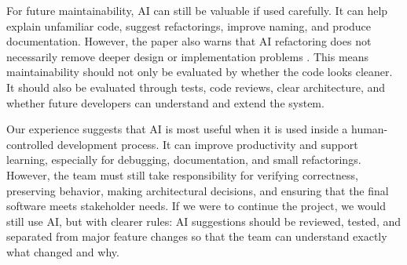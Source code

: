 For future maintainability, AI can still be valuable if used carefully.
It can help explain unfamiliar code, suggest refactorings, improve naming, and produce documentation.
However, the paper also warns that AI refactoring does not necessarily remove deeper design or implementation problems \cite{Study_of_AI}. 
This means maintainability should not only be evaluated by whether the code looks cleaner.
It should also be evaluated through tests, code reviews,
clear architecture, and whether future developers can understand and extend the system.

Our experience suggests that AI is most useful when it is used inside a human-controlled development process. 
It can improve productivity and support learning, especially for debugging, documentation, and small refactorings. 
However, the team must still take responsibility for verifying correctness, preserving behavior, making architectural decisions, 
and ensuring that the final software meets stakeholder needs. 
If we were to continue the project, we would still use AI, but with clearer rules: AI suggestions should be reviewed, tested,
and separated from major feature changes so that the team can understand exactly what changed and why.





